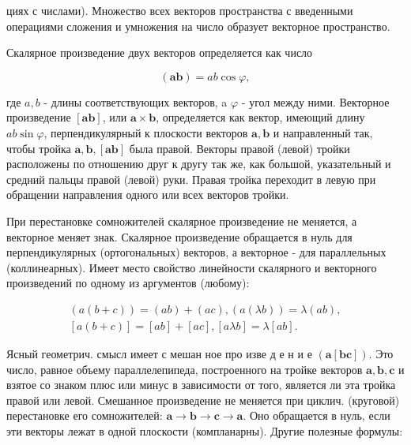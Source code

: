 \documentclass[10pt]{article}
\begin{document}
циях с числами). Множество всех векторов пространства с введенными операциями сложения и умножения на число образует векторное пространство.



Скалярное произведение двух векторов определяется как число



\[

(\boldsymbol{a b})=a b \cos \varphi,

\]



где $a, b$ - длины соответствующих векторов, a $\varphi$ - угол между ними. Векторное произведение $[\boldsymbol{a b}]$, или $\boldsymbol{a} \times \boldsymbol{b}$, определяется как вектор, имеющий длину $a b \sin \varphi$, перпендикулярный к плоскости векторов $\boldsymbol{a}, \boldsymbol{b}$ и направленный так, чтобы тройка $\boldsymbol{a}, \boldsymbol{b},[\boldsymbol{a} \boldsymbol{b}]$ была правой. Векторы правой (левой) тройки расположены по отношению друг к другу так же, как большой, указательный и средний пальцы правой (левой) руки. Правая тройка переходит в левую при обращении направления одного или всех векторов тройки.



При перестановке сомножителей скалярное произведение не меняется, а векторное меняет знак. Скалярное произведение обращается в нуль для перпендикулярных (ортогональных) векторов, а векторное - для параллельных (коллинеарных). Имеет место свойство линейности скалярного и векторного произведений по одному из аргументов (любому):



\[

\begin{gathered}

(a(b+c))=(a b)+(a c),(a(\lambda b))=\lambda(a b), \\

{[a(b+c)]=[a b]+[a c],[a \lambda b]=\lambda[a b] .}

\end{gathered}

\]



Ясный геометрич. смысл имеет с мешан ное про изве д е н и е $(\boldsymbol{a}[\boldsymbol{b} \boldsymbol{c}])$. Это число, равное объему параллелепипеда, построенного на тройке векторов $\boldsymbol{a}, \boldsymbol{b}, \boldsymbol{c}$ и взятое со знаком плюс или минус в зависимости от того, является ли эта тройка правой или левой. Смешанное произведение не меняется при циклич. (круговой) перестановке его сомножителей: $\boldsymbol{a} \rightarrow \boldsymbol{b} \rightarrow \boldsymbol{c} \rightarrow \boldsymbol{a}$. Оно обращается в нуль, если эти векторы лежат в одной плоскости (компланарны). Другие полезные формулы:
\end{document}
